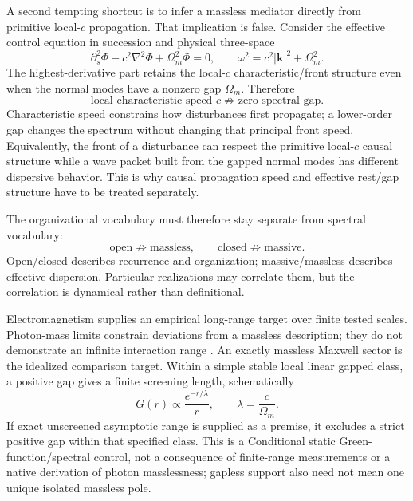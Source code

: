 \documentclass[11pt]{article}
\theoremstyle{definition}
\begin{document}
A second tempting shortcut is to infer a massless mediator directly from primitive local-$c$ propagation.  That implication is false.  Consider the effective control equation in succession and physical three-space
\begin{equation}
 \partial_s^2\Phi-c^2\nabla^2\Phi+\Omega_m^2\Phi=0,
 \qquad
 \omega^2=c^2|\mathbf k|^2+\Omega_m^2.
 \label{eq:gapped_local_c_control}
\end{equation}
The highest-derivative part retains the local-$c$ characteristic/front structure even when the normal modes have a nonzero gap $\Omega_m$.  Therefore
\begin{equation}
 \boxed{
 \text{local characteristic speed }c
 \not\Rightarrow
 \text{zero spectral gap}.}
 \label{eq:local_c_not_gapless}
\end{equation}
Characteristic speed constrains how disturbances first propagate; a lower-order gap changes the spectrum without changing that principal front speed.  Equivalently, the front of a disturbance can respect the primitive local-$c$ causal structure while a wave packet built from the gapped normal modes has different dispersive behavior.  This is why causal propagation speed and effective rest/gap structure have to be treated separately.

The organizational vocabulary must therefore stay separate from spectral vocabulary:
\begin{equation}
 \boxed{\text{open}\not\Rightarrow\text{massless},\qquad
 \text{closed}\not\Rightarrow\text{massive}.}
 \label{eq:open_closed_not_mass}
\end{equation}
Open/closed describes recurrence and organization; massive/massless describes effective dispersion.  Particular realizations may correlate them, but the correlation is dynamical rather than definitional.

Electromagnetism supplies an empirical long-range target over finite tested
scales.  Photon-mass limits constrain deviations from a massless
description; they do not demonstrate an infinite interaction range \cite{GoldhaberNieto2010}.
An exactly massless Maxwell sector is the idealized comparison target.  Within a simple stable local linear gapped class, a positive gap gives a finite screening length, schematically
\begin{equation}
 G(r)\propto\frac{e^{-r/\lambda}}{r},
 \qquad \lambda=\frac{c}{\Omega_m}.
 \label{eq:yukawa_screening}
\end{equation}
If exact unscreened asymptotic range is supplied as a premise, it excludes a
strict positive gap within that specified class.  This is a Conditional
static Green-function/spectral control, not a consequence of finite-range
measurements or a native derivation of photon masslessness; gapless support also need not mean one unique isolated massless pole.
\end{document}
